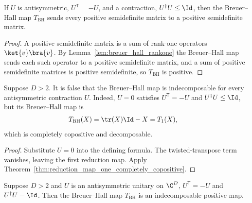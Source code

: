 \begin{theorem}
    \label{thm:breuer_hall_positive}
    \leanok
    If $U$ is antisymmetric, $U^{\mathsf T}=-U$, and a contraction,
    $U^{\dagger}U\le\Id$, then the Breuer--Hall map $T_{\mathrm{BH}}$ sends every
    positive semidefinite matrix to a positive semidefinite matrix.
\end{theorem}

\begin{proof}
    \leanok
    A positive semidefinite matrix is a sum of rank-one operators
    $\ket{v}\bra{v}$. By Lemma~\ref{lem:breuer_hall_rankone} the Breuer--Hall map
    sends each such operator to a positive semidefinite matrix, and a sum of
    positive semidefinite matrices is positive semidefinite, so $T_{\mathrm{BH}}$
    is positive.
\end{proof}

\begin{theorem}
    \label{thm:breuer_hall_contraction_counterexample}
    \leanok
    Suppose $D>2$. It is false that the Breuer--Hall map is indecomposable for
    every antisymmetric contraction $U$. Indeed, $U=0$ satisfies
    $U^{\mathsf T}=-U$ and $U^{\dagger}U\le\Id$, but its Breuer--Hall map is
    \begin{align}
        T_{\mathrm{BH}}(X) & =\tr(X)\Id-X=T_1(X),
        \notag
    \end{align}
    which is completely copositive and decomposable.
\end{theorem}

\begin{proof}\leanok
    Substitute $U=0$ into the defining formula. The twisted-transpose term
    vanishes, leaving the first reduction map. Apply
    Theorem~\ref{thm:reduction_map_one_completely_copositive}.
\end{proof}

\begin{theorem}
    \label{thm:breuer_hall_indecomposable}
    \leanok
    Suppose $D>2$ and $U$ is an antisymmetric unitary on $\C^{D}$,
    $U^{\mathsf T}=-U$ and $U^{\dagger}U=\Id$. Then the Breuer--Hall map
    $T_{\mathrm{BH}}$ is an indecomposable positive map.
\end{theorem}

